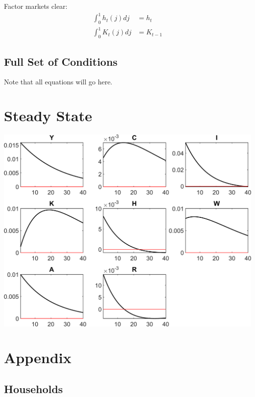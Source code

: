 \documentclass[11pt,preprint]{elsarticle}
\let\origfigure\figure
\let\endorigfigure\endfigure
\renewenvironment{figure}[1][2] {
    \expandafter\origfigure\expandafter[H]
} {
    \endorigfigure
}
\numberwithin{equation}{section}
\numberwithin{figure}{section}
\numberwithin{table}{section}
\begin{document}
Factor markets clear: \begin{align}
\int_0^1 h_t(j) dj &= h_t \\
\int_0^1 K_t(j) dj &= K_{t-1}
\end{align}

\subsection{Full Set of Conditions}\label{full-set-of-conditions}

Note that all equations will go here.

\section{Steady State}\label{steady-state}

\begin{figure}
\centering
\includegraphics{code/rbc_model/rbc_model/graphs/rbc_model_IRF_eps_cropped.png}
\caption{image}
\end{figure}

\newpage
\newpage

\section{Appendix}\label{appendix}

\subsection{Households}\label{households-1}
\end{document}
